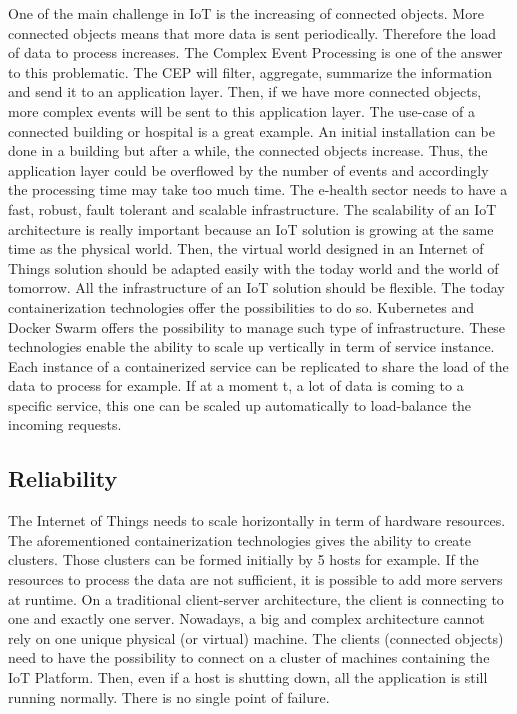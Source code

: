 \documentclass[11pt]{article}
\begin{document}
One of the main challenge in IoT is the increasing of connected objects. More connected objects means that more data is sent periodically. Therefore the load of data to process increases. The Complex Event Processing is one of the answer to this problematic. The CEP will filter, aggregate, summarize the information and send it to an application layer. Then, if we have more connected objects, more complex events will be sent to this application layer. The use-case of a connected building or hospital is a great example. An initial installation can be done in a building but after a while, the connected objects increase. Thus, the application layer could be overflowed by the number of events and accordingly the processing time may take too much time. The e-health sector needs to have a fast, robust, fault tolerant and scalable infrastructure. The scalability of an IoT architecture is really important because an IoT solution is growing at the same time as the physical world. Then, the virtual world designed in an Internet of Things solution should be adapted easily with the today world and the world of tomorrow. 
\newline
\newline
All the infrastructure of an IoT solution should be flexible. The today containerization technologies offer the possibilities to do so. Kubernetes and Docker Swarm offers the possibility to manage such type of infrastructure. These technologies enable the ability to scale up vertically in term of service instance. Each instance of a containerized service can be replicated to share the load of the data to process for example. If at a moment t, a lot of data is coming to a specific service, this one can be scaled up automatically to load-balance the incoming requests. 

\subsection{Reliability}

The Internet of Things needs to scale horizontally in term of hardware resources. The aforementioned containerization technologies gives the ability to create clusters. Those clusters can be formed initially by 5 hosts for example. If the resources to process the data are not sufficient, it is possible to add more servers at runtime. On a traditional client-server architecture, the client is connecting to one and exactly one server. Nowadays, a big and complex architecture cannot rely on one unique physical (or virtual) machine. The clients (connected objects) need to have the possibility to connect on a cluster of machines containing the IoT Platform. Then, even if a host is shutting down, all the application is still running normally. There is no single point of failure.
\end{document}
